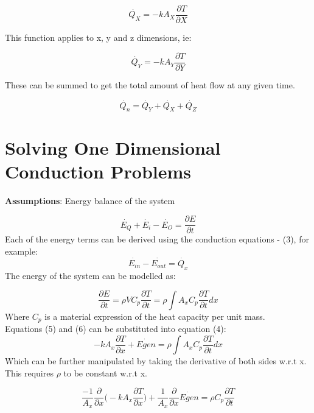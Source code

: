 \documentclass[•]{article}
\begin{document}
\begin{equation}
\dot{Q_X} = -kA_X\frac{\partial T}{\partial X}
\end{equation}

This function applies to x, y and z dimensions, ie:

\begin{equation}
\dot{Q_Y} = -kA_Y\frac{\partial T}{\partial Y}
\end{equation}

These can be summed to get the total amount of heat flow at any given time.


\begin{equation}
\dot{Q_n} = \dot{Q_Y} + \dot{Q_X} + \dot{Q_Z}
\end{equation}

\section*{Solving One Dimensional Conduction Problems}
\textbf{Assumptions}: Energy balance of the system

\begin{equation}
\dot{E_Q} + \dot{E_i} - \dot{E_O} = \frac{\partial E}{\partial t}
\end{equation}
Each of the energy terms can be derived using the conduction equations - (3), for example:
\begin{equation}
\dot{E_{in}} - \dot{E_{out}} = \dot{Q_x}
\end{equation}
The energy of the system can be modelled as:

\begin{equation}
\frac{\partial E}{\partial t} = \rho VC_p\frac{\partial T}{\partial t} = \rho\int A_x C_p \frac{\partial T}{\partial t}dx
\end{equation}
Where $C_p$ is a material expression of the heat capacity per unit mass.\\
Equations (5) and (6) can be substituted into equation (4):
\begin{equation}
-kA_x\frac{\partial T}{\partial x} + {\dot{Egen}} = \rho\int A_x C_p \frac{\partial T}{\partial t}dx
\end{equation}
Which can be further manipulated by taking the derivative of both sides w.r.t x. This requires $\rho$ to be constant w.r.t x.

\begin{equation}
\frac{-1}{A_x}\frac{\partial}{\partial x} \Big(-kA_x\frac{\partial T}{\partial x}\Big) + \frac{1}{A_x}\frac{\partial}{\partial x}{\dot{Egen}} = \rho C_p \frac{\partial T}{\partial t}
\end{equation}
\end{document}

